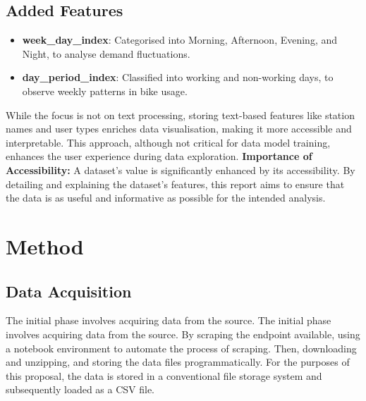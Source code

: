 \documentclass[12pt, a4paper]{article}
\begin{document}
    \subsection{Added Features}\label{subsec:added-features}
    \begin{itemize}
        \item \textbf{week\_day\_index}: Categorised into Morning, Afternoon, Evening, and Night, to analyse demand fluctuations.
        \item \textbf{day\_period\_index}: Classified into working and non-working days, to observe weekly patterns in bike usage.
    \end{itemize}

    While the focus is not on text processing, storing text-based features like station names and user types enriches data visualisation, making it more accessible and interpretable.
    This approach, although not critical for data model training, enhances the user experience during data exploration.\newline
    \newline\textbf{Importance of Accessibility:}\newline
    A dataset's value is significantly enhanced by its accessibility.
    By detailing and explaining the dataset's features, this report aims to ensure that the data is as useful and informative as possible for the intended analysis.

    \section*{Method}
    \label{sec:method}

    \subsection{Data Acquisition}\label{subsec:data-acquisition}

     The initial phase involves acquiring data from the source.
    The initial phase involves acquiring data from the source.
    By scraping the endpoint available, using a notebook environment to automate the process of scraping.
    Then, downloading and unzipping, and storing the data files programmatically.
    For the purposes of this proposal, the data is stored in a conventional file storage system and subsequently loaded as a CSV file.
\end{document}
